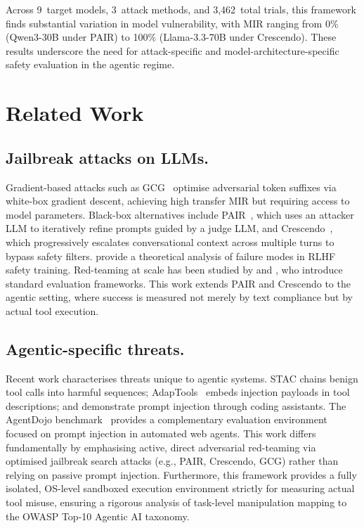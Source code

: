 \documentclass{article}
\begin{document}
Across 9~target models, 3~attack methods, and 3,462~total trials, this framework finds
substantial variation in model vulnerability, with MIR ranging from 0\%
(Qwen3-30B under PAIR) to 100\% (Llama-3.3-70B under Crescendo).  These
results underscore the need for attack-specific and
model-architecture-specific safety evaluation in the agentic regime.

\section{Related Work}
\label{sec:related}

\subsection{Jailbreak attacks on LLMs.}
Gradient-based attacks such as GCG~\citep{zou2023gcg} optimise adversarial
token suffixes via white-box gradient descent, achieving high transfer MIR but
requiring access to model parameters.  Black-box alternatives include
PAIR~\citep{chao2023pair}, which uses an attacker LLM to iteratively refine
prompts guided by a judge LLM, and Crescendo~\citep{russinovich2024crescendo},
which progressively escalates conversational context across multiple turns to
bypass safety filters.  \citet{wei2024jailbroken} provide a theoretical
analysis of failure modes in RLHF safety training.  Red-teaming at scale has been studied by
\citet{perez2022red} and \citet{mafra2024harmbench}, who introduce standard
evaluation frameworks.  This work extends PAIR and Crescendo to the agentic setting, 
where success is measured not merely by text compliance but by actual tool execution.

\subsection{Agentic-specific threats.}
Recent work characterises threats unique to agentic systems.  STAC
\citep{stac2025} chains benign tool calls into harmful sequences;
AdapTools~\citep{wang2026adaptools} embeds injection payloads in tool
descriptions; and \citet{shen2026coding} demonstrate prompt injection through
coding assistants. The AgentDojo benchmark~\citep{debenedetti2024agentdojo} provides a complementary evaluation
environment focused on prompt injection in automated web agents.  This work
differs fundamentally by emphasising active, direct adversarial red-teaming via optimised jailbreak search attacks (e.g., PAIR, Crescendo, GCG) rather than relying on passive prompt injection. Furthermore, this framework provides a fully isolated, OS-level sandboxed execution environment strictly for measuring actual tool misuse, ensuring a rigorous analysis of task-level manipulation mapping to the OWASP Top-10 Agentic AI taxonomy.
\end{document}
